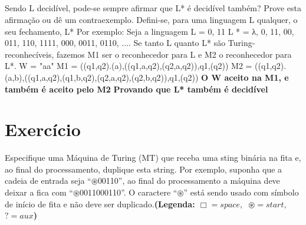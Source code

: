 \documentclass[12pt]{scrartcl}
\begin{document}
\subsection{}
Sendo L decidível, pode-se sempre afirmar que L* é decidível também? Prove esta afirmação ou dê um contraexemplo.
 \newline Defini-se, para uma linguagem L qualquer, o seu fechamento, L*
 \newline Por exemplo:
 \newline Seja a linguagem L = {0, 11}
 \newline  L * = { λ, 0, 11, 00, 011, 110, 1111, 000, 0011, 0110, .... } 
 \newline Se tanto L quanto L* são Turing-reconhecíveis, fazemos M1 ser o reconhecedor para L e M2 o reconhecedor para L*.
 \newline W = "aa"
\newline M1 = ((q1,q2).(a),((q1,a,q2),(q2,a,q2)),q1,(q2)) 
\newline M2 = ((q1,q2).(a,b),((q1,a,q2),(q1,b,q2),(q2,a,q2),(q2,b,q2)),q1,(q2))
\newline \textbf{O W aceito na M1, e também é aceito pelo M2}
\newline\textbf{ Provando que L* também é decidível}




\section{Exercício}
Especifique uma Máquina de Turing (MT) que receba uma sting binária na fita e,
ao final do processamento, duplique esta string. Por exemplo, suponha que a cadeia
de entrada seja “$\circledast$00110”, ao final do processamento a máquina deve deixar a fica com
“$\circledast$0011000110”. O caractere “$\circledast$” está sendo usado com símbolo de início de fita e não
deve ser duplicado.\textbf{(Legenda: $\Box = space,$\  $\circledast = start,$ \  $?=aux$)}
\end{document}
